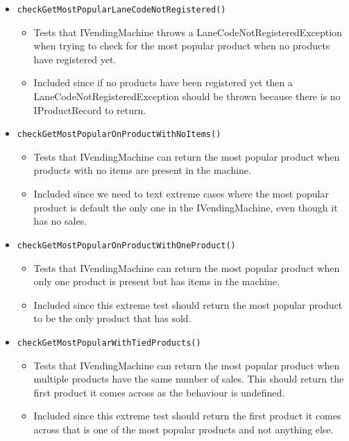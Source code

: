 \documentclass{article}
\begin{document}
\begin{itemize}
\item \verb+checkGetMostPopularLaneCodeNotRegistered()+
\begin{itemize}
\item Tests that IVendingMachine throws a LaneCodeNotRegisteredException when trying to check for the most popular product when no products have registered yet.
\item Included since if no products have been registered yet then a LaneCodeNotRegisteredException should be thrown because there is no IProductRecord to return.
\end{itemize}

\item \verb+checkGetMostPopularOnProductWithNoItems()+
\begin{itemize}
\item Tests that IVendingMachine can return the most popular product when products with no items are present in the machine.
\item Included since we need to text extreme cases where the most popular product is default the only one in the IVendingMachine, even though it has no sales.
\end{itemize}

\item \verb+checkGetMostPopularOnProductWithOneProduct()+
\begin{itemize}
\item Tests that IVendingMachine can return the most popular product when only one product is present but has items in the machine.
\item Included since this extreme test should return the most popular product to be the only product that has sold.
\end{itemize}

\item \verb+checkGetMostPopularWithTiedProducts()+
\begin{itemize}
\item Tests that IVendingMachine can return the most popular product when multiple products have the same number of sales. This should return the first product it comes across as the behaviour is undefined.
\item Included since this extreme test should return the first product it comes across that is one of the most popular products and not anything else.
\end{itemize}

\end{itemize}
\end{document}
